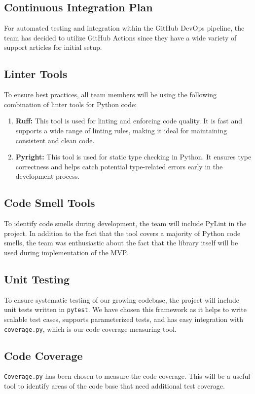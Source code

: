 \documentclass{article}
\begin{document}
\subsection{Continuous Integration Plan}
For automated testing and integration within the GitHub DevOps pipeline, the team has decided to utilize GitHub Actions since they have a wide variety of support articles for initial setup.

\subsection{Linter Tools}
To ensure best practices, all team members will be using the
following combination of linter tools for Python code:
\begin{enumerate}
  \item \textbf{Ruff:} This tool is used for linting and enforcing code quality. It is fast and supports a wide range of linting rules, making it ideal for maintaining consistent and clean code.
  \item \textbf{Pyright:} This tool is used for static type checking in Python. It ensures type correctness and helps catch potential type-related errors early in the development process.
\end{enumerate}


\subsection{Code Smell Tools}
To identify code smells during development, the team will include
PyLint in the project. In addition to the fact that the tool covers
a majority of Python code smells, the team was enthusiastic about the
fact that the library itself will be used during implementation of the MVP.

\subsection{Unit Testing}
To ensure systematic testing of our growing codebase, the project
will include unit tests written in \texttt{pytest}. We have chosen
this framework as it helps to write scalable test cases, supports
parameterized tests, and has easy integration with
\texttt{coverage.py}, which is our code coverage measuring tool.

\subsection{Code Coverage}
\texttt{Coverage.py} has been chosen to measure the code coverage.
This will be a useful tool to identify areas of the code base that
need additional test coverage.
\end{document}
